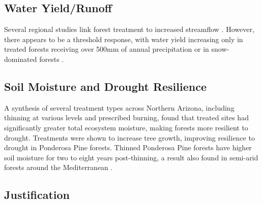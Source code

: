\documentclass[
  number]{elsarticle}
\begin{document}
\subsection{Water Yield/Runoff}\label{water-yieldrunoff}

Several regional studies link forest treatment to increased streamflow
\citep{dwivedi_how_2024, biederman_streamflow_2022, broxton_subseasonal_2023}.
However, there appears to be a threshold response, with water yield
increasing only in treated forests receiving over 500mm of annual
precipitation or in snow-dominated forests
\citep{biederman_streamflow_2022, carroll_evaluating_2016, adams_ecohydrological_2012, zou_streamflow_2010, hibbert1979}.

\subsection{Soil Moisture and Drought
Resilience}\label{soil-moisture-and-drought-resilience}

A synthesis of several treatment types across Northern Arizona,
including thinning at various levels and prescribed burning, found that
treated sites had significantly greater total ecosystem moisture, making
forests more resilient to
drought\citep{sankey_regionalscale_2021, sankey_thinning_2022}.
Treatments were shown to increase tree growth, improving resilience to
drought in Ponderosa Pine forests\citep{rodman2024}. Thinned Ponderosa
Pine forests have higher soil moisture for two to eight years
post-thinning, a result also found in semi-arid forests around the
Mediterranean
\citep{belmonte_soil_2022, del_campo_global_2022, odonnell_vegetation_2021, del_campo_effectiveness_2019}.

\subsection{Justification}\label{justification}
\end{document}
